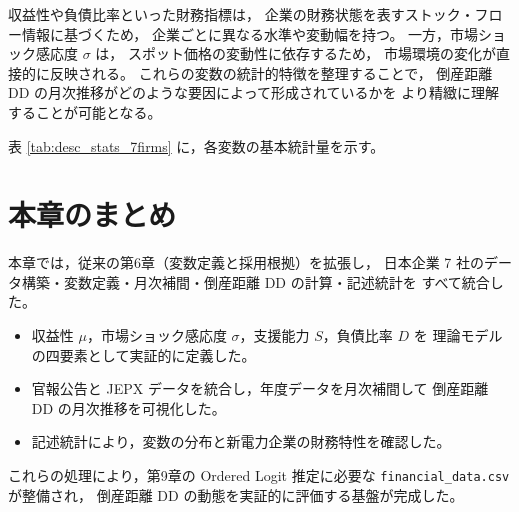 収益性や負債比率といった財務指標は，
企業の財務状態を表すストック・フロー情報に基づくため，
企業ごとに異なる水準や変動幅を持つ。
一方，市場ショック感応度 $\sigma$ は，
スポット価格の変動性に依存するため，
市場環境の変化が直接的に反映される。
これらの変数の統計的特徴を整理することで，
倒産距離 DD の月次推移がどのような要因によって形成されているかを
より精緻に理解することが可能となる。

表 \ref{tab:desc_stats_7firms} に，各変数の基本統計量を示す。



\section{本章のまとめ}

本章では，従来の第6章（変数定義と採用根拠）を拡張し，
日本企業 7 社のデータ構築・変数定義・月次補間・倒産距離 DD の計算・記述統計を
すべて統合した。

\begin{itemize}
  \item 収益性 $\mu$，市場ショック感応度 $\sigma$，支援能力 $S$，負債比率 $D$ を
        理論モデルの四要素として実証的に定義した。
  \item 官報公告と JEPX データを統合し，年度データを月次補間して
        倒産距離 DD の月次推移を可視化した。
  \item 記述統計により，変数の分布と新電力企業の財務特性を確認した。
\end{itemize}

これらの処理により，第9章の Ordered Logit 推定に必要な
\texttt{financial\_data.csv} が整備され，
倒産距離 DD の動態を実証的に評価する基盤が完成した。
